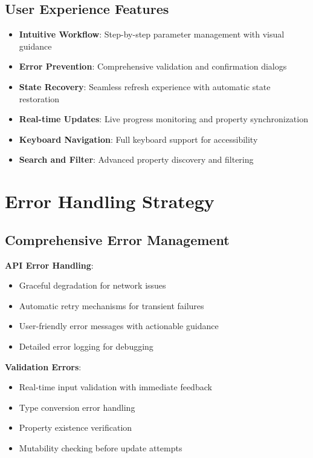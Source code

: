 \documentclass[12pt,a4paper]{article}
\begin{document}
\subsection{User Experience Features}

\begin{itemize}
    \item \textbf{Intuitive Workflow}: Step-by-step parameter management with visual guidance
    \item \textbf{Error Prevention}: Comprehensive validation and confirmation dialogs
    \item \textbf{State Recovery}: Seamless refresh experience with automatic state restoration
    \item \textbf{Real-time Updates}: Live progress monitoring and property synchronization
    \item \textbf{Keyboard Navigation}: Full keyboard support for accessibility
    \item \textbf{Search and Filter}: Advanced property discovery and filtering
\end{itemize}

\section{Error Handling Strategy}

\subsection{Comprehensive Error Management}

\textbf{API Error Handling}:
\begin{itemize}
    \item Graceful degradation for network issues
    \item Automatic retry mechanisms for transient failures
    \item User-friendly error messages with actionable guidance
    \item Detailed error logging for debugging
\end{itemize}

\textbf{Validation Errors}:
\begin{itemize}
    \item Real-time input validation with immediate feedback
    \item Type conversion error handling
    \item Property existence verification
    \item Mutability checking before update attempts
\end{itemize}
\end{document}
